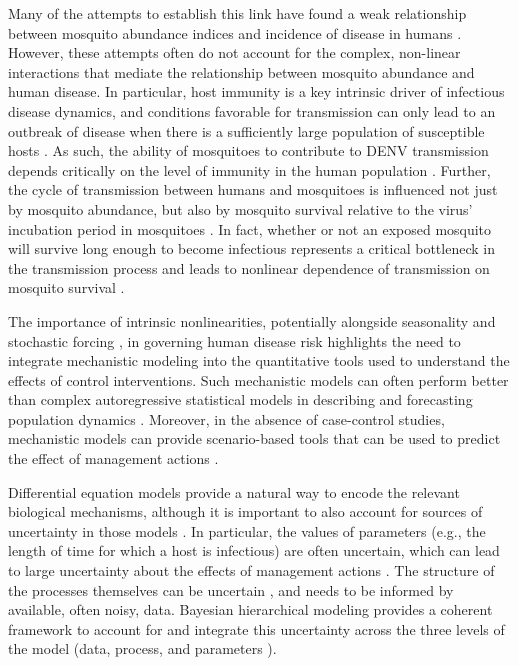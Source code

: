 \documentclass[10pt,letterpaper]{article}
\begin{document}
Many of the attempts to establish this link have found a weak relationship between mosquito abundance indices and incidence of disease in humans \cite{Bowman2014, Pepin2015, Cromwell2017}.
However, these attempts often do not account for the complex, non-linear interactions that mediate the relationship between mosquito abundance and human disease.
In particular, host immunity is a key intrinsic driver of infectious disease dynamics, and conditions favorable for transmission can only lead to an outbreak of disease when there is a sufficiently large population of susceptible hosts \cite{Koelle2004, Koelle2005}.
As such, the ability of mosquitoes to contribute to DENV transmission depends critically on the level of immunity in the human population \cite{Scott2010a}.
Further, the cycle of transmission between humans and mosquitoes is influenced not just by mosquito abundance, but also by mosquito survival relative to the virus' incubation period in mosquitoes \cite{Smith2012}.
In fact, whether or not an exposed mosquito will survive long enough to become infectious represents a critical bottleneck in the transmission process and leads to nonlinear dependence of transmission on mosquito survival \cite{Smith2012}.

The importance of intrinsic nonlinearities, potentially alongside seasonality and stochastic forcing \cite{Ellner1998, Koelle2004, Grenfell2002}, in governing human disease risk highlights the need to integrate mechanistic modeling into the quantitative tools used to understand the effects of control interventions.
Such mechanistic models can often perform better than complex autoregressive statistical models in describing and forecasting population dynamics \cite{Reilly2005}.
Moreover, in the absence of case-control studies, mechanistic models can provide scenario-based tools that can be used to predict the effect of management actions \cite{Buckland2007}.

Differential equation models provide a natural way to encode the relevant biological mechanisms, although it is important to also account for sources of uncertainty in those models \cite{Hotelling1927, Wikle2010}.
In particular, the values of parameters (e.g., the length of time for which a host is infectious) are often uncertain, which can lead to large uncertainty about the effects of management actions \cite{Elderd2006}.
The structure of the processes themselves can be uncertain \cite{Ellner1998}, and needs to be informed by available, often noisy, data.
Bayesian hierarchical modeling provides a coherent framework to account for and integrate this uncertainty across the three levels of the model (data, process, and parameters \cite{Berliner1996, Cressie2009}).
\end{document}
